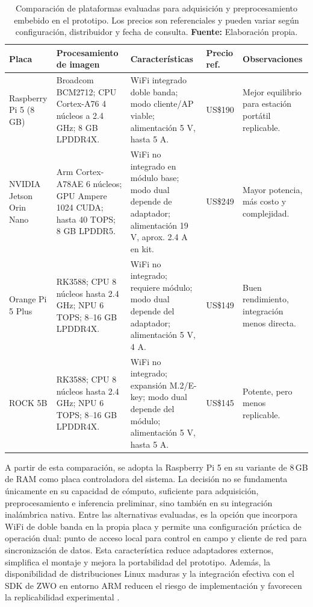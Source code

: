 \begin{table}[H]
\centering
\caption{Comparación de plataformas evaluadas para adquisición y preprocesamiento embebido en el prototipo. Los precios son referenciales y pueden variar según configuración, distribuidor y fecha de consulta. \textbf{Fuente:} Elaboración propia.}
\label{tab:comparacion_plataformas_embebidas}
\uniformtablestyle
\begin{tabularx}{\textwidth}{>{\raggedright\arraybackslash}p{2.65cm} >{\raggedright\arraybackslash}p{2.75cm} X >{\centering\arraybackslash}p{1.35cm} >{\raggedright\arraybackslash}p{2.55cm}}
\toprule
\textbf{Placa} & \textbf{Procesamiento de imagen} & \textbf{Características} & \textbf{Precio ref.} & \textbf{Observaciones} \\
\midrule
Raspberry Pi 5 (8 GB) & Broadcom BCM2712; CPU Cortex-A76 4 núcleos a 2.4 GHz; 8 GB LPDDR4X. & WiFi integrado doble banda; modo cliente/AP viable; alimentación 5 V, hasta 5 A. & US\$190 & Mejor equilibrio para estación portátil replicable. \\

NVIDIA Jetson Orin Nano & Arm Cortex-A78AE 6 núcleos; GPU Ampere 1024 CUDA; hasta 40 TOPS; 8 GB LPDDR5. & WiFi no integrado en módulo base; modo dual depende de adaptador; alimentación 19 V, aprox. 2.4 A en kit. & US\$249 & Mayor potencia, más costo y complejidad. \\

Orange Pi 5 Plus & RK3588; CPU 8 núcleos hasta 2.4 GHz; NPU 6 TOPS; 8--16 GB LPDDR4X. & WiFi no integrado; requiere módulo; modo dual depende del adaptador; alimentación 5 V, 4 A. & US\$149 & Buen rendimiento, integración menos directa. \\

ROCK 5B & RK3588; CPU 8 núcleos hasta 2.4 GHz; NPU 6 TOPS; 8--16 GB LPDDR4X. & WiFi no integrado; expansión M.2/E-key; modo dual depende del módulo; alimentación 5 V, hasta 5 A. & US\$145 & Potente, pero menos replicable. \\
\bottomrule
\end{tabularx}
\end{table}

A partir de esta comparación, se adopta la Raspberry Pi 5 en su variante de
8\,GB de RAM como placa controladora del sistema. La decisión no se fundamenta
únicamente en su capacidad de cómputo, suficiente para adquisición,
preprocesamiento e inferencia preliminar, sino también en su integración
inalámbrica nativa. Entre las alternativas evaluadas, es la opción que incorpora
WiFi de doble banda en la propia placa y permite una configuración práctica de
operación dual: punto de acceso local para control en campo y cliente de red para
sincronización de datos. Esta característica reduce adaptadores externos,
simplifica el montaje y mejora la portabilidad del prototipo. Además, la
disponibilidad de distribuciones Linux maduras y la integración efectiva con el
SDK de ZWO en entorno ARM reducen el riesgo de implementación y favorecen la
replicabilidad experimental \citep{raspberryPi5Docs2026,nmcliHotspot2026,zwoASILinuxManual}.


